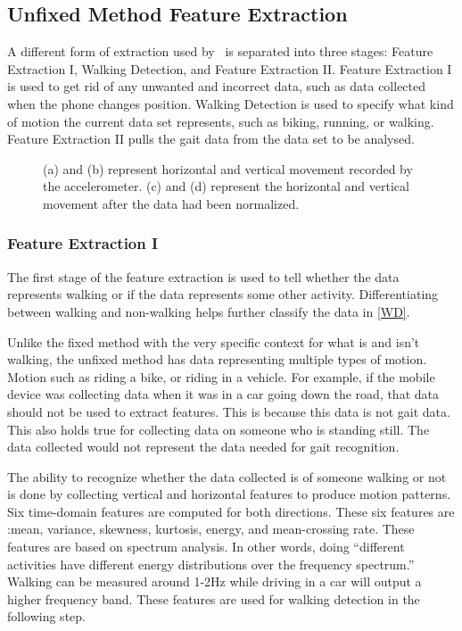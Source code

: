 \documentclass{sig-alternate}
\begin{document}
\subsection{Unfixed Method Feature Extraction}
	A different form of extraction used by~\cite{Lu:2014} is separated into three stages: Feature Extraction I, Walking Detection, and Feature Extraction II. Feature Extraction I is used to get rid of any unwanted and incorrect data, such as data collected when the phone changes position. Walking Detection is used to specify what kind of motion the current data set represents, such as biking, running, or walking. Feature Extraction II pulls the gait data from the data set to be analysed. 
\begin{figure}
\centering
{}
\caption{(a) and (b) represent horizontal and vertical movement recorded by the accelerometer. (c) and (d) represent the horizontal and vertical movement after the data had been normalized.}
\label{fig:TD1}
\end{figure}


\subsubsection{Feature Extraction I}
	The first stage of the feature extraction is used to tell whether the data represents walking or if the data represents some other activity. Differentiating between walking and non-walking helps further classify the data in \ref{WD}.
	
	 Unlike the fixed method with the very specific context for what is and isn't walking, the unfixed method has data representing multiple types of motion. Motion such as riding a bike, or riding in a vehicle. For example, if the mobile device was collecting data when it was in a car going down the road, that data should not be used to extract features. This is because this data is not gait data. This also holds true for collecting data on someone who is standing still. The data collected would not represent the data needed for gait recognition.
 	
	The ability to recognize whether the data collected is of someone walking or not is done by collecting vertical and horizontal features to produce motion patterns. Six time-domain features are computed for both directions. These six features are :mean, variance, skewness, kurtosis, energy, and mean-crossing rate. These features are based on spectrum analysis. In other words, doing ``different activities have different energy distributions over the frequency spectrum.''~\cite{Lu:2014} Walking can be measured around 1-2Hz while driving in a car will output a higher frequency band. These features are used for walking detection in the following step.
			
\end{document}
